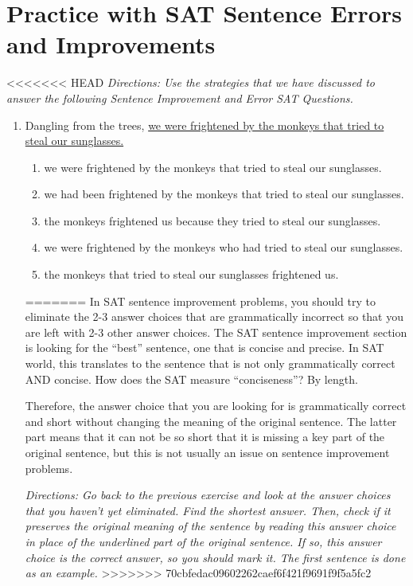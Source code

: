 \section{Practice with SAT Sentence Errors and Improvements}

<<<<<<< HEAD
\textit{Directions: Use the strategies that we have discussed to answer the following Sentence Improvement and Error SAT Questions.}

\begin{enumerate}
\item Dangling from the trees, \ul{we were frightened by the monkeys that tried to steal our sunglasses.}

\bigskip
\begin{enumerate}[label=(\Alph*)]
\item we were frightened by the monkeys that tried to steal our sunglasses.
\item we had been frightened by the monkeys that tried to steal our sunglasses.
\item the monkeys frightened us because they tried to steal our sunglasses.
\item we were frightened by the monkeys who had tried to steal our sunglasses.
\item the monkeys that tried to steal our sunglasses frightened us. 
\end{enumerate}
=======
In SAT sentence improvement problems, you should try to eliminate the 2-3 answer choices that are grammatically incorrect so that you are left with 2-3 other answer choices. The SAT sentence improvement section is looking for the ``best'' sentence, one that is concise and precise. In SAT world, this translates to the sentence that is not only grammatically correct AND concise. How does the SAT measure ``conciseness''? By length.

\bigskip
Therefore, the answer choice that you are looking for is grammatically correct and short without changing the meaning of the original sentence. The latter part means that it can not be so short that it is missing a key part of the original sentence,
but this is not usually an issue on sentence improvement problems.

\bigskip
\textit{Directions: Go back to the previous exercise and look at the answer choices that you haven't yet eliminated. Find the shortest answer. Then, check if it preserves the original meaning of the sentence by reading this answer choice in place of the underlined part of the original sentence. If so, this answer choice is the correct answer, so you should mark it. The first sentence is done as an example.}
>>>>>>> 70cbfedac09602262caef6f421f9691f9f5a5fc2



\end{enumerate}
